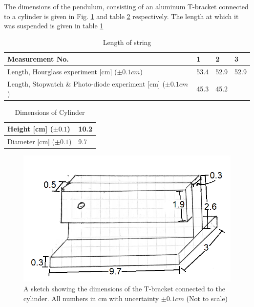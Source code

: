 \documentclass[%
 reprint,
 amsmath,amssymb,
 aps,
]{revtex4-1}
\begin{document}
    	The dimensions of the pendulum, consisting of an aluminum T-bracket connected to a cylinder is given in Fig. \ref{fig:tbracket} and table \ref{tab:cylinder} respectively. The length at which it was suspended is given in table \ref{tab:string}

        \begin{table}[h] %
            \center
            \caption{Length of string}
            \label{tab:string}
            \begin{tabular}{| p{5cm} | l | l | l |}
                \hline
                Measurement No. & 1 & 2 & 3 \\ \hline 
                Length, Hourglass experiment [cm] ($\pm 0.1cm$) 
                & 53.4 & 52.9 & 52.9\\ \hline
                Length, Stopwatch \& Photo-diode experiment [cm] ($\pm 0.1cm$) 
                & 45.3 & 45.2 &  \\ \hline
            \end{tabular}
        \end{table}

        \begin{table}[h] %
            \center
            \caption{Dimensions of Cylinder}
            \label{tab:cylinder}
            \begin{tabular}{| l | l |}
                \hline
                Height [cm] ($\pm 0.1$)& 10.2 \\ \hline 
                Diameter [cm] ($\pm 0.1$)& 9.7 \\ \hline

            \end{tabular}
        \end{table}

    \begin{figure}
        \center
        \includegraphics[scale=0.45]{T-bracket_diagram.png}
        \caption{A sketch showing the dimensions of the T-bracket connected to the cylinder. All numbers in cm with uncertainty $\pm 0.1 cm$ (Not to scale)}
        \label{fig:tbracket}
    \end{figure}
\end{document}
